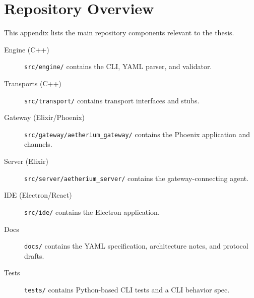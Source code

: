 
%







\chapter{Repository Overview}
\label{app:repo}

This appendix lists the main repository components relevant to the thesis.

\begin{description}
  \item[Engine (C++)] \texttt{src/engine/} contains the CLI, YAML parser, and validator.
  \item[Transports (C++)] \texttt{src/transport/} contains transport interfaces and stubs.
  \item[Gateway (Elixir/Phoenix)] \texttt{src/gateway/aetherium\_gateway/} contains the Phoenix application and channels.
  \item[Server (Elixir)] \texttt{src/server/aetherium\_server/} contains the gateway-connecting agent.
  \item[IDE (Electron/React)] \texttt{src/ide/} contains the Electron application.
  \item[Docs] \texttt{docs/} contains the YAML specification, architecture notes, and protocol drafts.
  \item[Tests] \texttt{tests/} contains Python-based CLI tests and a CLI behavior spec.
\end{description}

